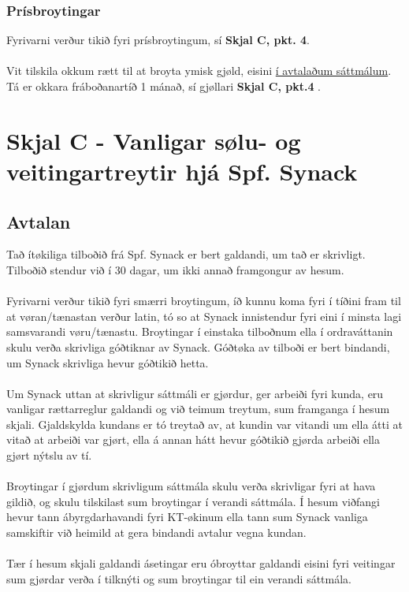 \subsubsection*{Prísbroytingar}
Fyrivarni verður tikið fyri prísbroytingum, sí \textbf{Skjal C, pkt. 4}. \\ \\
Vit tilskila okkum rætt til at broyta ymisk gjøld, eisini \underline{í avtalaðum sáttmálum}. Tá er okkara fráboðanartíð 1 mánað, sí gjøllari \textbf{Skjal C, pkt.4} . \\
\newpage


\section{Skjal C - Vanligar sølu- og veitingartreytir hjá Spf. Synack}
\subsection{Avtalan}
Tað ítøkiliga tilboðið frá Spf. Synack er bert galdandi, um tað er skrivligt. Tilboðið stendur við í 30 dagar, um ikki annað framgongur av hesum. \\ \\
Fyrivarni verður tikið fyri smærri broytingum, íð kunnu koma fyri í tíðini fram til at vøran/tænastan verður latin, tó so at Synack innistendur fyri eini í minsta lagi samsvarandi vøru/tænastu. Broytingar í einstaka tilboðnum ella í ordraváttanin skulu verða skrivliga góðtiknar av Synack. Góðtøka av tilboði er bert bindandi, um Synack skrivliga hevur góðtikið hetta. \\ \\
Um Synack uttan at skrivligur sáttmáli er gjørdur, ger arbeiði fyri kunda, eru vanligar rættarreglur galdandi og við teimum treytum, sum framganga í hesum skjali. Gjaldskylda kundans er tó treytað av, at kundin var vitandi um ella átti at vitað at arbeiði var gjørt, ella á annan hátt hevur góðtikið gjørda arbeiði ella gjørt nýtslu av tí. \\ \\
Broytingar í gjørdum skrivligum sáttmála skulu verða skrivligar fyri at hava gildið, og skulu tilskilast sum broytingar í verandi sáttmála. Í hesum viðfangi hevur tann ábyrgdarhavandi fyri KT-økinum ella tann sum Synack vanliga samskiftir við heimild at gera bindandi avtalur vegna kundan. \\ \\
Tær í hesum skjali galdandi ásetingar eru óbroyttar galdandi eisini fyri veitingar sum gjørdar verða í tilknýti og sum broytingar til ein verandi sáttmála.

